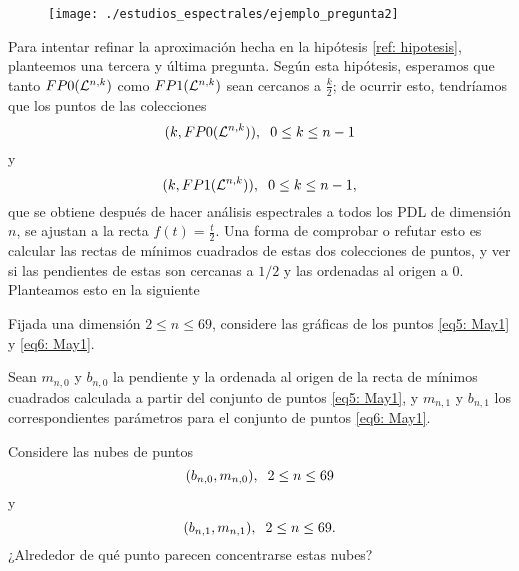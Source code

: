 \begin{figure}[H]
	\centering
	\texttt{[image: ./estudios\_espectrales/ejemplo\_pregunta2]} 
\end{figure}	


Para intentar refinar la aproximación hecha
en la hipótesis 
\ref{ref: hipotesis}, 
planteemos una tercera y última pregunta. 
Según esta hipótesis,
esperamos que tanto $FP0(\mathcal{L}^{n,k})$
como $FP1(\mathcal{L}^{n,k})$ sean cercanos a 
$\frac{k}{2}$; de ocurrir esto, tendríamos que los puntos de
las colecciones 
\begin{equation}
\label{eq5: May1}
(k, FP0(\mathcal{L}^{n,k})), \hspace{0.2cm} 0 \leq k \leq n-1
\end{equation}
y 
\begin{equation}
\label{eq6: May1}
(k, FP1(\mathcal{L}^{n,k})), \hspace{0.2cm} 0 \leq k \leq n-1,
\end{equation}
que se obtiene después de hacer análisis espectrales
a todos los PDL de dimensión $n$,
se ajustan a la recta $f(t) = \frac{t}{2}$. 
Una forma de comprobar o refutar esto es calcular las
rectas de mínimos cuadrados de estas dos colecciones
de puntos, y ver si las pendientes de estas son cercanas
a $1/2$ y las ordenadas al origen a $0$.
Planteamos esto en la siguiente


\begin{pregunta}
\label{preg 3}
Fijada una dimensión $2 \leq n \leq 69$,
considere las gráficas de los
puntos \eqref{eq5: May1}
y \eqref{eq6: May1}.

Sean $m_{n,0}$ y $b_{n,0}$ la pendiente y la ordenada
al origen de la recta de mínimos cuadrados calculada a 
partir del conjunto de puntos 
\eqref{eq5: May1}, y
$m_{n,1}$ y $b_{n,1}$ los correspondientes parámetros
para el conjunto de puntos 
\eqref{eq6: May1}.

Considere las nubes de puntos 
\[
(b_{n,0}, m_{n,0}), \hspace{0.2cm} 2 \leq n \leq 69
\]
y 
\[
(b_{n,1}, m_{n,1}), \hspace{0.2cm} 2 \leq n \leq 69.
\]
¿Alrededor de qué punto parecen concentrarse estas nubes?
\end{pregunta}


